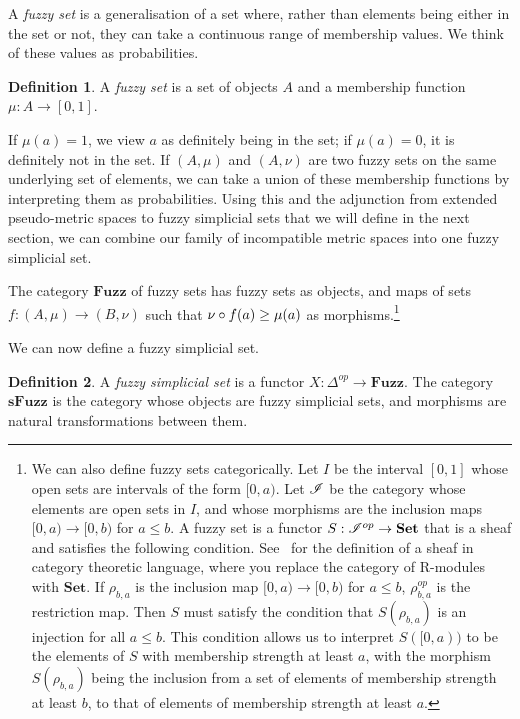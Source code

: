 \documentclass[a4paper,11pt,leqno]{article} \usepackage{amsmath}
\theoremstyle{definition}
\newtheorem{defn}{Definition}
\begin{document}
A \emph{fuzzy set} is a generalisation of a set where, rather than elements
being either in the set or not, they can take a continuous range of membership
values.
We think of these values as probabilities.

\begin{defn}
  A \emph{fuzzy set} is a set of objects $A$ and a membership function $\mu:
  A\to [0, 1]$.
\end{defn}

If $\mu(a) = 1$, we view $a$ as definitely being in the set; if $\mu(a) = 0$,
it is definitely not in the set.
If $(A, \mu)$ and $(A, \nu)$ are two fuzzy sets on the same underlying set of
elements, we can take a union of these membership functions by interpreting
them as probabilities.
Using this and the adjunction from extended pseudo-metric spaces to fuzzy
simplicial sets that we will define in the next section, we can combine our
family of incompatible metric spaces into one fuzzy simplicial set.

The category $\textbf{Fuzz}$ of fuzzy sets has fuzzy sets as objects, and maps
of sets $f: (A, \mu)\to (B,\nu)$ such that $\nu\circ f(a) \geq \mu(a)$ as
morphisms.\footnote{
  We can also define fuzzy sets categorically.
  Let $I$ be the interval $[0, 1]$ whose open sets are intervals of the form
  $[0, a)$.
  Let $\mathscr{I}$ be the category whose elements are open sets in $I$, and
  whose morphisms are the inclusion maps $[0, a)\to [0, b)$ for $a\leq b$.
  A fuzzy set is a functor $S: \mathscr{I}^{op}\to \textbf{Set}$ that is a sheaf and
  satisfies the following condition.
  See~\cite{Weng} for the definition of a sheaf in category theoretic language,
  where you replace the category of R-modules with $\textbf{Set}$.
  If $\rho_{b, a}$ is the inclusion map $[0, a)\to [0, b)$ for $a\leq b$,
  $\rho_{b, a}^{op}$ is the restriction map.
  Then $S$ must satisfy the condition that $S(\rho_{b,a})$ is an injection for
  all $a\leq b$.
  This condition allows us to interpret $S([0, a))$ to be the elements of $S$
  with membership strength at least $a$, with the morphism $S(\rho_{b,a})$
  being the inclusion from a set of elements of membership strength at least
  $b$, to that of elements of membership strength at least $a$.
}

We can now define a fuzzy simplicial set.

\begin{defn}
  \label{definition_fuzzy_simplicial_set}
  A \emph{fuzzy simplicial set} is a functor $X: \Delta^{op}\to \textbf{Fuzz}$.
  The category $\textbf{sFuzz}$ is the category whose objects are fuzzy
  simplicial sets, and morphisms are natural transformations between them.
\end{defn}
\end{document}

